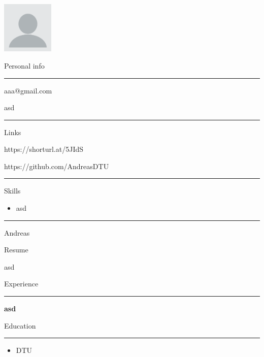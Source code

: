 \documentclass{letter}
\begin{document}
\begin{minipage}[t]{0.40\textwidth}
\setlength{\baselineskip}{1.5\baselineskip}
\color{white}
\vspace{1cm}

\includegraphics[width=70pt, height=70pt]{FaceShot.png}

{\large Personal info}

\rule{\linewidth}{0.4pt}

\faPhone {}


\faEnvelope \quad aaa@gmail.com


\faMapMarker \quad asd

\rule{\linewidth}{0.4pt}

{\large Links}

\faCode \quad https://shorturl.at/5JIdS

\faGithub \quad https://github.com/AndreasDTU

\rule{\linewidth}{0.4pt}

{\large Skills}
\begin{itemize}
    \item asd
\end{itemize}



\rule{\linewidth}{0.4pt}


\end{minipage}
\hfill
\begin{minipage}[t]{0.60\textwidth}
\setlength{\baselineskip}{1.5\baselineskip}
\vspace{0.8cm}
{\huge Andreas}

{\large Resume}

\vspace{0.5cm}
 
asd

\vspace{0.5cm}

{\large Experience}
\rule{\linewidth}{0.4pt}

{\large \textbf{asd}}

{\large Education}
\rule{\linewidth}{0.4pt}
\begin{itemize}
    \item DTU
\end{itemize}



\end{minipage}
\end{document}
